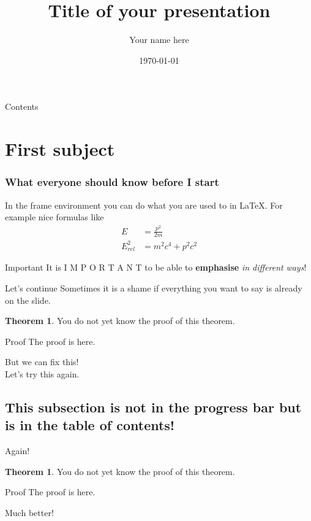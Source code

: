 \documentclass{beamer}
\title{Title of your presentation}
\date{\today}
\author{Your name here}
\theoremstyle{definition}
\theoremstyle{example}
\newtheorem{thm}[dfn]{Theorem}%
\begin{document}
\begin{frame}
\titlepage
\end{frame}	

\begin{frame}{Contents} %
	\tableofcontents
\end{frame}
\section{First subject}


\begin{frame}
	\frametitle{What everyone should know before I start}
	In the frame environment you can do what you are used to in \LaTeX. For example nice formulas like
	\begin{align}
	E &= \frac{p^2}{2m}\\
	E_{rel}^2 &= m^2c^4 + p^2c^2
	\end{align}
	\begin{block}{Important}
		It is \quad I M P O R T A N T \quad to be able to \textbf{emphasise} \textit{in different} \emph{ways}!
	\end{block}
 
\end{frame}

\begin{frame}{Let's continue}
Sometimes it is a shame if everything you want to say is already on the slide.\newline
\begin{thm}
	You do not yet know the proof of this theorem.
\end{thm}
\begin{block}{Proof}
	The proof is here.
\end{block}
But we can fix this!\\
Let's try this again.

\end{frame}

\subsection{This subsection is not in the progress bar but is in the table of contents!}

\begin{frame}{Again!}
\begin{thm}
	You do not yet know the proof of this theorem.
\end{thm}
\pause
\begin{block}{Proof}
	The proof is here.
\end{block}
\pause
Much better!
\end{frame}
\end{document}
